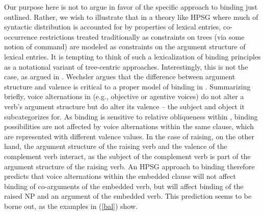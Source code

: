 \documentclass[output=paper
 	        ,biblatex
                ,babelshorthands
                ,newtxmath
                ,draftmode
                ,colorlinks, citecolor=brown
]{langscibook}
\begin{document}
Our purpose here is not to argue in favor of the specific approach to binding just outlined. Rather, we wish to illustrate that in a theory like HPSG where much of syntactic distribution is accounted for by properties of lexical entries, co-occurrence restrictions treated traditionally as constraints on trees (via some notion of command) are modeled as constraints on the argument structure of lexical entries. It is tempting to think of such a lexicalization of binding principles as a notational variant of tree-centric approaches. Interestingly, this is not the case, as argued in . Wechsler argues that the difference between argument structure and valence is critical to a proper model of binding in . Summarizing briefly, voice alternations in  (e.g., objective or agentive voices) do not alter a verb's argument structure but do alter its valence -- the subject and object it subcategorizes for. As binding is sensitive to relative obliqueness within , binding possibilities are not affected by voice alternations within the same clause, which are represented with different valence values. In the case of raising, on the other hand, the argument structure of the raising verb and the valence of the complement verb interact, as the subject of the complement verb is part of the argument structure of the raising verb. An HPSG approach to binding therefore predicts that voice alternations within the embedded clause will not affect binding of co-arguments of the embedded verb, but will affect binding of the raised NP and an argument of the embedded verb. This prediction seems to be borne out, as the  examples in (\ref{bal}) show. 
\end{document}
